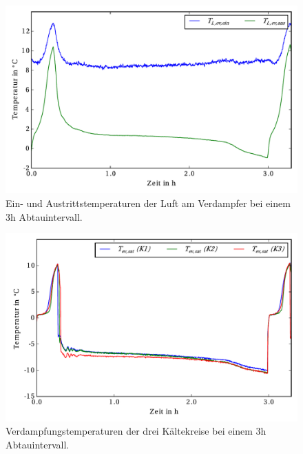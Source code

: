 \begin{figure}[h!]
\centering
\includegraphics[scale=0.8]{Pictures/51/T_air,evap1.pdf}
\caption{Ein- und Austrittstemperaturen der Luft am Verdampfer bei einem 3h Abtauintervall.}
\label{fig:TLuftevap51}
\end{figure}

\begin{figure}[h!]
\centering
\includegraphics[scale=0.8]{Pictures/51/Tsats_K1K2K3lastCycle1.pdf}
\caption{Verdampfungstemperaturen der drei Kältekreise bei einem 3h Abtauintervall.}
\label{fig:Tevap51}
\end{figure}



